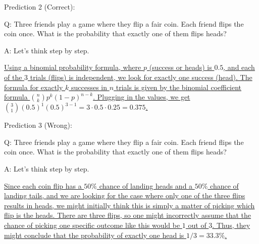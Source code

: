 \vspace{0.5em}
Prediction 2 (Correct):
\begin{tcolorbox}

\begingroup
\setlength{\leftskip}{2em}
\setlength{\rightskip}{2em}

Q: Three friends play a game where they flip a fair coin. Each friend flips the coin once. What is the probability that exactly one of them flips heads?

\vspace{0.5em}

A: Let's think step by step.

\vspace{0.2em}

\uline{Using a binomial probability formula, where $p$ (success or heads) is $0.5$, and each of the $3$ trials (flips) is independent, we look for exactly one success (head). The formula for exactly $k$ successes in $n$ trials is given by the binomial coefficient formula $\binom{n}{k} p^k (1-p)^{n-k}$. Plugging in the values, we get $\binom{3}{1} (0.5)^1 (0.5)^{3-1} = 3 \cdot 0.5 \cdot 0.25 = 0.375$.}

\endgroup

\end{tcolorbox}
\vspace{0.5em}

\vspace{0.5em}
Prediction 3 (Wrong):
\begin{tcolorbox}

\begingroup
\setlength{\leftskip}{2em}
\setlength{\rightskip}{2em}

Q: Three friends play a game where they flip a fair coin. Each friend flips the coin once. What is the probability that exactly one of them flips heads?

\vspace{0.5em}

A: Let's think step by step.

\vspace{0.2em}

\uline{Since each coin flip has a $50\%$ chance of landing heads and a $50\%$ chance of landing tails, and we are looking for the case where only one of the three flips results in heads, we might initially think this is simply a matter of picking which flip is the heads. There are three flips, so one might incorrectly assume that the chance of picking one specific outcome like this would be $1$ out of $3$. Thus, they might conclude that the probability of exactly one head is $1/3=33.3\%$.}

\endgroup

\end{tcolorbox}
\vspace{0.5em}


